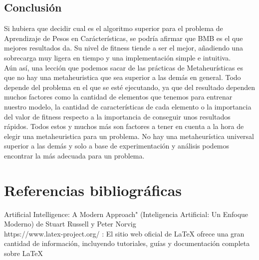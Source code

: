\documentclass[12pt, spanish]{article}
\begin{document}
\subsection{Conclusión}
Si hubiera que decidir cual es el algoritmo superior para el problema de Aprendizaje de Pesos en Carácterísticas, se podría afirmar que BMB es el que mejores resultados da. Su nivel de fitness tiende a ser el mejor, añadiendo una sobrecarga muy ligera en tiempo y una implementación simple e intuitiva. \\
\newline 
Aún así, una lección que podemos sacar de las prácticas de Metaheurísticas es que no hay una metaheuristica que sea superior a las demás en general. Todo depende del problema en el que se esté ejecutando, ya que del resultado dependen muchos factores como la cantidad de elementos que tenemos para entrenar nuestro modelo, la cantidad de características de cada elemento o la importancia del valor de fitness respecto a la importancia de conseguir unos resultados rápidos. Todos estos y muchos más son factores a tener en cuenta a la hora de elegir una metaheuristica para un problema. No hay una metaheurística universal superior a las demás y solo a base de experimentación y análisis podemos encontrar la más adecuada para un problema. 
\pagebreak
\section{Referencias bibliográficas}
Artificial Intelligence: A Modern Approach" (Inteligencia Artificial: Un Enfoque Moderno) de Stuart Russell y Peter Norvig \\
\newline
https://www.latex-project.org/ : El sitio web oficial de LaTeX ofrece una gran cantidad de información, incluyendo tutoriales, guías y documentación completa sobre LaTeX
\end{document}
